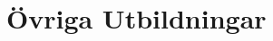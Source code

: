 \documentclass[a4paper]{twentysecondcv} %
\begin{document}

\newpage %
\makeprofile %

\section{Övriga Utbildningar} 
\end{document}
